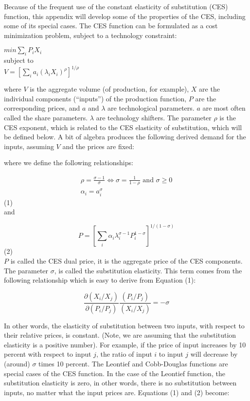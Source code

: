 \documentclass[12pt]{article}
\begin{document}
Because of the frequent use of the constant elasticity of substitution (CES) function, this appendix will develop some of the properties of the CES, including some of its special cases. The CES function can be formulated as a cost minimization problem, subject to a technology constraint:

\begin{center}

$min \displaystyle \sum_i P_iX_i$\\
subject to\\
$V = \left[\displaystyle \sum_i a_i (\lambda_i X_i)^\rho \right]^{1/\rho}$

\end{center}

where $V$ is the aggregate volume (of production, for example), $X$ are the individual components (“inputs”) of the production function, $P$ are the corresponding prices, and $a$ and $\lambda$ are technological parameters. $a$ are most often called the share parameters. $\lambda$ are technology shifters. The parameter $\rho$ is the CES exponent, which is related to the CES elasticity of substitution, which will be defined below.
A bit of algebra produces the following derived demand for the inputs, assuming $V$ and the prices are fixed:

where we define the following relationships:

$$
\begin{gathered}
\rho=\frac{\sigma-1}{\sigma} \Leftrightarrow \sigma=\frac{1}{1-\rho} \text { and } \sigma \geq 0 \\
\alpha_{i}=a_{i}^{\sigma}
\end{gathered}
$$
(1)\\[15pt]
and

$$
P=\left[\sum_{i} \alpha_{i} \lambda_{i}^{\sigma-1} P_{i}^{1-\sigma}\right]^{1 /(1-\sigma)}
$$
(2)\\[15pt]
$P$ is called the CES dual price, it is the aggregate price of the CES components. The parameter $\sigma$, is called the substitution elasticity. This term comes from the following relationship which is easy to derive from Equation (1):

$$
\frac{\partial\left(X_{i} / X_{j}\right)}{\partial\left(P_{i} / P_{j}\right)} \frac{\left(P_{i} / P_{j}\right)}{\left(X_{i} / X_{j}\right)}=-\sigma
$$

In other words, the elasticity of substitution between two inputs, with respect to their relative prices, is constant. (Note, we are assuming that the substitution elasticity is a positive number). For example, if the price of input increases by 10 percent with respect to input $j$, the ratio of input $i$ to input $j$ will decrease by (around) $\sigma$ times 10 percent.
The Leontief and Cobb-Douglas functions are special cases of the CES function. In the case of the Leontief function, the substitution elasticity is zero, in other words, there is no substitution between inputs, no matter what the input prices are. Equations (1) and (2) become:
\end{document}
